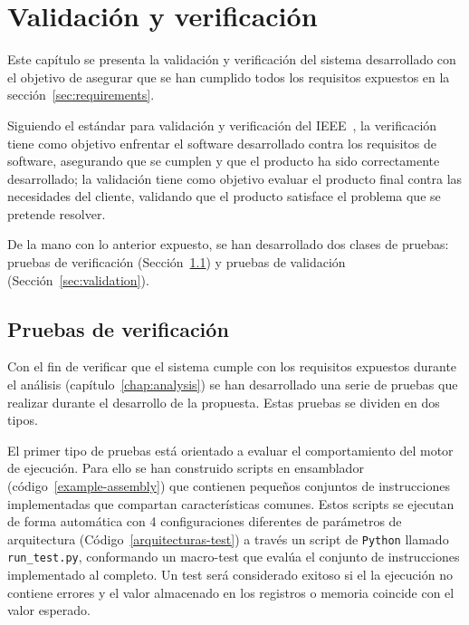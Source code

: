 \chapter{Validación y verificación}\label{chap:validation}

Este capítulo se presenta la validación y verificación del sistema desarrollado con el objetivo de asegurar que se han cumplido todos los requisitos expuestos en la sección~\ref{sec:requirements}.

Siguiendo el estándar para validación y  verificación del IEEE~\cite{6204026}, la verificación tiene como objetivo enfrentar el software desarrollado contra los requisitos de software, asegurando que se cumplen y que el producto ha sido correctamente desarrollado; la {validación} tiene como objetivo evaluar el producto final contra las necesidades del cliente, validando que el producto satisface el problema que se pretende resolver.

De la mano con lo anterior expuesto, se han desarrollado dos clases de pruebas: pruebas de verificación (Sección~\ref{sec:verification}) y pruebas de validación (Sección~\ref{sec:validation}).

{\printtesttemplate}

{\FloatBarrier}

\section{Pruebas de verificación}\label{sec:verification}

Con el fin de verificar que el sistema cumple con los requisitos expuestos durante el análisis (capítulo~\ref{chap:analysis}) se han desarrollado una serie de pruebas que realizar durante el desarrollo de la propuesta. Estas pruebas se dividen en dos tipos. 

El primer tipo de pruebas está orientado a evaluar el comportamiento del motor de ejecución. Para ello se han construido scripts en ensamblador (código~\ref{example-assembly}) que contienen pequeños conjuntos de instrucciones implementadas que compartan características comunes. Estos scripts se ejecutan de forma automática con 4 configuraciones diferentes de parámetros de arquitectura (Código~\ref{arquitecturas-test}) a través un script de \texttt{Python} llamado \texttt{run\_test.py}, conformando un macro-test que evalúa el conjunto de instrucciones implementado al completo. Un test será considerado exitoso si el la ejecución no contiene errores y el valor almacenado en los registros o memoria coincide con el valor esperado.

